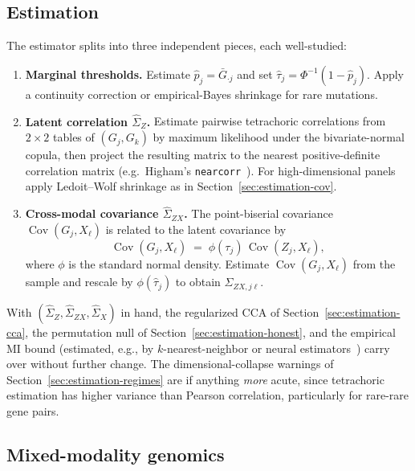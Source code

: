\documentclass{article}
\newcommand{\Cov}{\operatorname{Cov}}
\begin{document}
\subsection{Estimation}
\label{sec:bern-estimation}

The estimator splits into three independent pieces, each well-studied:

\begin{enumerate}
\item[(i)] \textbf{Marginal thresholds.} Estimate $\hat p_j = \bar G_{\cdot j}$
and set $\hat\tau_j = \Phi^{-1}(1-\hat p_j)$. Apply a continuity correction or
empirical-Bayes shrinkage for rare mutations.
\item[(ii)] \textbf{Latent correlation $\hat\Sigma_Z$.} Estimate pairwise
tetrachoric correlations from $2{\times}2$ tables of $(G_j, G_k)$ by maximum
likelihood under the bivariate-normal copula, then project the resulting matrix
to the nearest positive-definite correlation matrix (e.g.\ Higham's
\texttt{nearcorr}~\citep{higham2002nearcorr}). For high-dimensional panels apply Ledoit--Wolf shrinkage as
in Section~\ref{sec:estimation-cov}.
\item[(iii)] \textbf{Cross-modal covariance $\hat\Sigma_{ZX}$.} The
point-biserial covariance $\Cov(G_j, X_\ell)$ is related to the latent
covariance by
\[
  \Cov(G_j, X_\ell) \;=\; \phi(\tau_j)\,\Cov(Z_j, X_\ell),
\]
where $\phi$ is the standard normal density. Estimate $\Cov(G_j,X_\ell)$ from
the sample and rescale by $\phi(\hat\tau_j)$ to obtain $\hat\Sigma_{ZX, j\ell}$.
\end{enumerate}

With $(\hat\Sigma_Z, \hat\Sigma_{ZX}, \hat\Sigma_X)$ in hand, the regularized
CCA of Section~\ref{sec:estimation-cca}, the permutation null of
Section~\ref{sec:estimation-honest}, and the empirical MI bound
(estimated, e.g., by $k$-nearest-neighbor or neural
estimators~\citep{kraskov2004mi,belghazi2018mine,paninski2003entropy}) carry over
without further change. The dimensional-collapse warnings of
Section~\ref{sec:estimation-regimes} are if anything \emph{more} acute, since
tetrachoric estimation has higher variance than Pearson correlation,
particularly for rare-rare gene pairs.

\subsection{Mixed-modality genomics}
\label{sec:bern-mixed}
\end{document}
